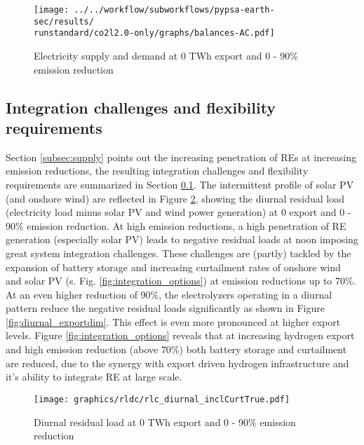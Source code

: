 
\begin{figure}[h!]
    \centering
    \texttt{[image: ../../workflow/subworkflows/pypsa-earth-sec/results/\\runstandard/co2l2.0-only/graphs/balances-AC.pdf]}
    \caption{Electricity supply and demand at 0 TWh export and 0 - 90\% emission reduction}
    \label{fig:balances-ac-0exp}
\end{figure}


\subsection{Integration challenges and flexibility requirements}
\label{subsec:integration_challenges}
Section \ref{subsec:supply} points out the increasing penetration of REs at increasing emission reductions, the resulting integration challenges and flexibility requirements are summarized in Section \ref{subsec:integration_challenges}. The intermittent profile of solar PV (and onshore wind) are reflected in Figure \ref{fig:diurnal}, showing the diurnal residual load (electricity load minus solar PV and wind power generation) at 0 export and 0 - 90\% emission reduction. At high emission reductions, a high penetration of RE generation (especially solar PV) leads to negative residual loads at noon imposing great system integration challenges. These challenges are (partly) tackled by the expansion of battery storage and increasing curtailment rates of onshore wind and solar PV (s. Fig. \ref{fig:integration_options}) at emission reductions up to $70$\%. At an even higher reduction of $90$\%, the electrolyzers operating in a diurnal pattern reduce the negative residual loads significantly as shown in Figure \ref{fig:diurnal_exportdim}. This effect is even more pronounced at higher export levels. Figure \ref{fig:integration_options} reveals that at increasing hydrogen export and high emission reduction (above $70$\%) both battery storage and curtailment are reduced, due to the synergy with export driven hydrogen infrastructure and it's ability to integrate RE at large scale.

\begin{figure}[h!]
    \centering
    \texttt{[image: graphics/rldc/rlc\_diurnal\_inclCurtTrue.pdf]}
    \caption{Diurnal residual load at 0 TWh export and 0 - 90\% emission reduction}
    \label{fig:diurnal}
\end{figure}

